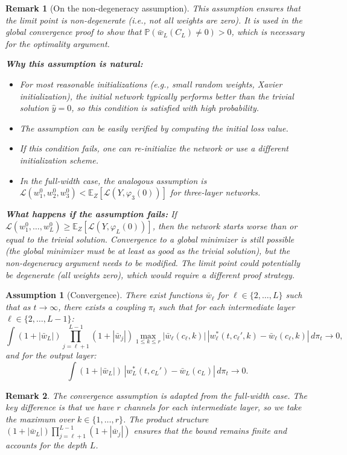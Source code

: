 \documentclass[11pt]{article}
\newcommand{\E}{\mathbb{E}}
\newcommand{\Pp}{\mathbb{P}}
\newcommand{\1}{\mathbbm{1}}
\newtheorem{assumption}{Assumption}
\newtheorem{remark}{Remark}
\begin{document}
\begin{remark}[On the non-degeneracy assumption]
This assumption ensures that the limit point is non-degenerate (i.e., not all weights are zero). It is used in the global convergence proof to show that $\Pp(\bar{w}_L(C_L) \ne 0) > 0$, which is necessary for the optimality argument.

\textbf{Why this assumption is natural:}
\begin{itemize}
\item For most reasonable initializations (e.g., small random weights, Xavier initialization), the initial network typically performs better than the trivial solution $\hat{y} = 0$, so this condition is satisfied with high probability.
\item The assumption can be easily verified by computing the initial loss value.
\item If this condition fails, one can re-initialize the network or use a different initialization scheme.
\item In the full-width case, the analogous assumption is $\mathscr{L}(w_1^0, w_2^0, w_3^0) < \E_Z[\mathcal{L}(Y, \varphi_3(0))]$ for three-layer networks.
\end{itemize}

\textbf{What happens if the assumption fails:} If $\mathscr{L}(w_1^0, \ldots, w_L^0) \ge \E_Z[\mathcal{L}(Y, \varphi_L(0))]$, then the network starts worse than or equal to the trivial solution. Convergence to a global minimizer is still possible (the global minimizer must be at least as good as the trivial solution), but the non-degeneracy argument needs to be modified. The limit point could potentially be degenerate (all weights zero), which would require a different proof strategy.
\end{remark}

\begin{assumption}[Convergence]\label{assump:convergence-lowrank}
There exist functions $\bar{w}_\ell$ for $\ell\in\{2,\dots,L\}$ such that as $t\to\infty$, there exists a coupling $\pi_t$ such that for each intermediate layer $\ell\in\{2,\dots,L-1\}$:
\[
\int (1+|\bar{w}_L|)\prod_{j=\ell+1}^{L-1}(1+|\bar{w}_j|)\max_{1\le k\le r}|\bar{w}_\ell(c_\ell,k)|\,|w_\ell^*(t,c_\ell',k)-\bar{w}_\ell(c_\ell,k)|\,d\pi_t \to 0,
\]
and for the output layer:
\[
\int (1+|\bar{w}_L|)\,|w_L^*(t,c_L')-\bar{w}_L(c_L)|\,d\pi_t \to 0.
\]
\end{assumption}

\begin{remark}
The convergence assumption is adapted from the full-width case. The key difference is that we have $r$ channels for each intermediate layer, so we take the maximum over $k\in\{1,\dots,r\}$. The product structure $(1+|\bar{w}_L|)\prod_{j=\ell+1}^{L-1}(1+|\bar{w}_j|)$ ensures that the bound remains finite and accounts for the depth $L$.
\end{remark}
\end{document}

